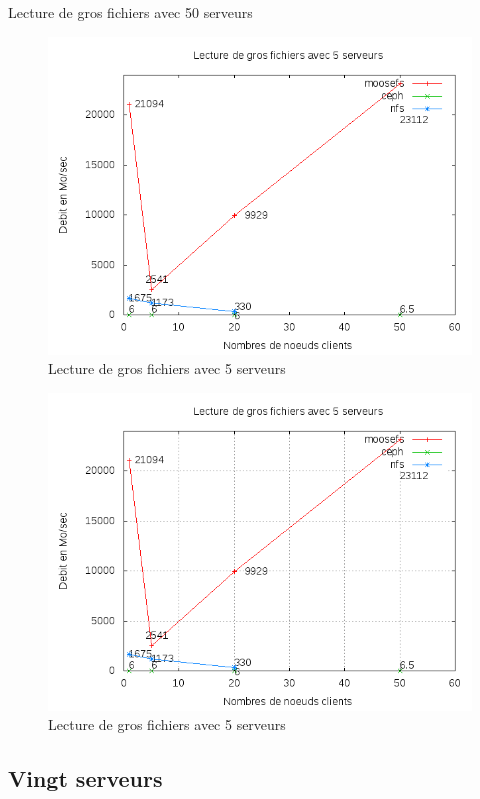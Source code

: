 \documentclass[12pt]{report}
\begin{document}
Lecture de gros fichiers avec 50 serveurs
\begin{figure}[H]
\begin{center}
\includegraphics[bb=0 0 640 480,width=14cm]{images/srv5rb.png}
\caption{Lecture de gros fichiers avec 5 serveurs}
\end{center}
\end{figure} 
\begin{figure}[H]
\begin{center}
\includegraphics[bb=0 0 640 480,width=14cm]{images/srv5rb2.png}
\caption{Lecture de gros fichiers avec 5 serveurs}
\end{center}
\end{figure} 
			\subsection{Vingt serveurs}
\end{document}
